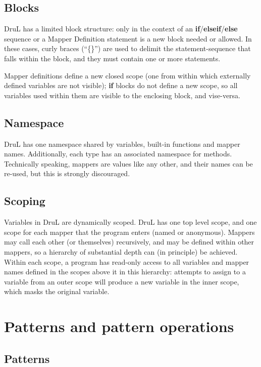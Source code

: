 \subsection{Blocks}

DruL has a limited block structure: only in the context of an \textbf{if}/\textbf{elseif}/\textbf{else} sequence or a Mapper Definition statement is a new block needed or allowed.  In these cases, curly braces (``\{\}'') are used to delimit the statement-sequence that falls within the block, and they must contain one or more statements.

Mapper definitions define a new closed scope (one from within which externally defined variables are not visible); \textbf{if} blocks do not define a new scope, so all variables used within them are visible to the enclosing  block, and vise-versa.

\subsection{Namespace}

DruL has one namespace shared by variables, built-in functions and
mapper names. Additionally, each type has an associated namespace for methods.  Technically speaking, mappers are values like any other, and their names can be re-used, but this is strongly discouraged.

\subsection{Scoping}

Variables in DruL are dynamically scoped.
DruL has one top level scope, and one scope for each mapper that the program enters
(named or anonymous). Mappers may call each other (or themselves) recursively, and may be defined within other mappers, so a hierarchy of substantial depth can (in principle) be achieved.
Within each scope, a program has read-only access to all variables and mapper names
defined in the scopes above it in this hierarchy: attempts to assign to a variable from an outer scope
will produce a new variable in the inner scope, which masks the original variable.

\section{Patterns and pattern operations}

\subsection{Patterns}

